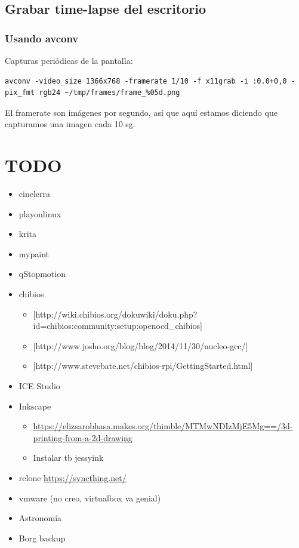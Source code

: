 \documentclass[12pt,spanish,]{scrartcl}
\providecommand{\tightlist}{%
  \setlength{\itemsep}{0pt}\setlength{\parskip}{0pt}}
\begin{document}
\hypertarget{grabar-time-lapse-del-escritorio}{%
\subsection{Grabar time-lapse del
escritorio}\label{grabar-time-lapse-del-escritorio}}

\hypertarget{usando-avconv}{%
\subsubsection{Usando avconv}\label{usando-avconv}}

Capturas periódicas de la pantalla:

\begin{verbatim}
avconv -video_size 1366x768 -framerate 1/10 -f x11grab -i :0.0+0,0 -pix_fmt rgb24 ~/tmp/frames/frame_%05d.png
\end{verbatim}

El framerate son imágenes por segundo, así que aquí estamos diciendo que
capturamos una imagen cada 10 sg.

\hypertarget{todo-1}{%
\section{TODO}\label{todo-1}}

\begin{itemize}
\tightlist
\item
  cinelerra
\item
  playonlinux
\item
  krita
\item
  mypaint
\item
  qStopmotion
\item
  chibios

  \begin{itemize}
  \tightlist
  \item
    {[}http://wiki.chibios.org/dokuwiki/doku.php?id=chibios:community:setup:openocd\_chibios{]}
  \item
    {[}http://www.josho.org/blog/blog/2014/11/30/nucleo-gcc/{]}
  \item
    {[}http://www.stevebate.net/chibios-rpi/GettingStarted.html{]}
  \end{itemize}
\item
  ICE Studio
\item
  Inkscape

  \begin{itemize}
  \tightlist
  \item
    \url{https://elizsarobhasa.makes.org/thimble/MTMwNDIzMjE5Mg==/3d-printing-from-a-2d-drawing}
  \item
    Instalar tb jessyink
  \end{itemize}
\item
  rclone \url{https://syncthing.net/}
\item
  vmware (no creo, virtualbox va genial)
\item
  Astronomía
\item
  Borg backup
\end{itemize}
\end{document}
